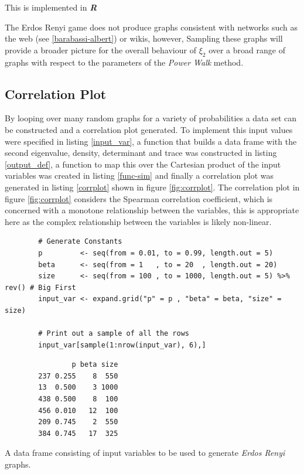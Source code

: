 \documentclass[11pt]{report}
\begin{document}
This is implemented in \textbf{\emph{R}} \cite[IgraphManualPagesa]{IgraphManualPages}

The Erdos Renyi game does not produce graphs consistent with networks such as
the web (see \ref{barabassi-albert}) or wikis, however, Sampling these graphs will
provide a broader picture for the overall behaviour of \(\xi_{2}\) over a broad
range of graphs with respect to the parameters of the \emph{Power Walk} method.

\subsection{Correlation Plot}
\label{correlation-plot}
By looping over many random graphs for a variety of probabilities a data set can
be constructed and a correlation plot generated. To implement this input values
were specified in listing \ref{input_var}, a function that builds a data frame with
the second eigenvalue, density, determinant and trace was constructed in listing
\ref{output_def}, a function to map this over the Cartesian product of the input
variables was created in listing \ref{func-sim} and finally a correlation plot
was generated in listing \ref{corrplot} shown in figure \ref{fig:corrplot}. The
correlation plot in figure \ref{fig:corrplot} considers the Spearman correlation
coefficient, which is concerned with a monotone relationship between the
variables, this is appropriate here as the complex relationship between the
variables is likely non-linear.


\begin{listing}[htbp]
    \begin{tcolorbox}
        \begin{verbatim}
        # Generate Constants
        p         <- seq(from = 0.01, to = 0.99, length.out = 5)
        beta      <- seq(from = 1   , to = 20  , length.out = 20)
        size      <- seq(from = 100 , to = 1000, length.out = 5) %>% rev() # Big First
        input_var <- expand.grid("p" = p , "beta" = beta, "size" = size)

        # Print out a sample of all the rows
        input_var[sample(1:nrow(input_var), 6),]
        \end{verbatim}
    \tcblower
        \begin{verbatim}
                p beta size
        237 0.255    8  550
        13  0.500    3 1000
        438 0.500    8  100
        456 0.010   12  100
        209 0.745    2  550
        384 0.745   17  325
        \end{verbatim}
    \end{tcolorbox}
\caption{\label{input_var}A data frame consisting of input variables to be used to generate \emph{Erdos Renyi} graphs.}
\end{listing}
\end{document}
